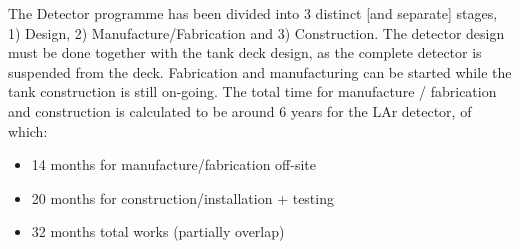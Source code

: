 The Detector programme has been divided into 3 distinct [and separate] stages, 1) Design, 2) Manufacture/Fabrication and 3) Construction.  The detector design must be done together with the tank deck design, as the complete detector is suspended from the deck.  Fabrication and manufacturing can be started while the tank construction is still on-going.  The total time for manufacture / fabrication and construction is calculated to be around 6 years for the LAr detector, of which:
\begin{itemize}
\item{14 months		for manufacture/fabrication off-site}
\item{20 months		for construction/installation + testing}
\item{32 months		total works (partially overlap)}
\end{itemize}


